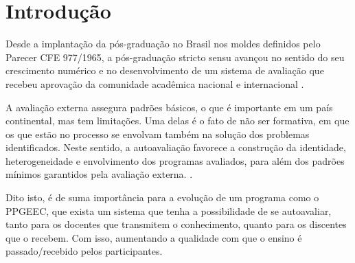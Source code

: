 \chapter{Introdução}
\label{cap:introducao}

    
    Desde a implantação da pós-graduação no Brasil nos moldes definidos pelo
Parecer CFE 977/1965, a pós-graduação stricto sensu avançou no sentido do seu
crescimento numérico e no desenvolvimento de um sistema de avaliação que recebeu
aprovação da comunidade acadêmica nacional e internacional \cite{capes2019}.

    A avaliação externa assegura padrões básicos, o que é importante
em um país continental, mas tem limitações. Uma delas é o fato de não ser formativa,
em que os que estão no processo se envolvam também na solução dos problemas
identificados. Neste sentido, a autoavaliação favorece a construção da identidade,
heterogeneidade e envolvimento dos programas avaliados, para além dos padrões
mínimos garantidos pela avaliação externa.
 \cite{capes2019}.
    
    Dito isto, é de suma importância para a evolução de um programa como o \gls{PPGEEC}, que exista um sistema que tenha a possibilidade de se autoavaliar, tanto para os docentes que transmitem o conhecimento, quanto para os discentes que o recebem. Com isso, aumentando a qualidade com que o ensino é passado/recebido pelos participantes.




	

	
